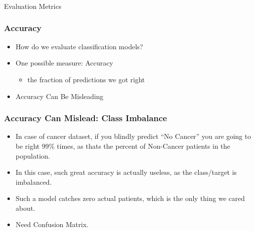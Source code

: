 \begin{frame}[fragile]\frametitle{}
\begin{center}
{\Large Evaluation Metrics}
\end{center}
\end{frame}


\begin{frame}[fragile]\frametitle{Accuracy}
\begin{itemize}
\item How do we evaluate classification models?
\item One possible measure: Accuracy
	\begin{itemize}
	\item the fraction of predictions we got right
	\end{itemize}
\item Accuracy Can Be Misleading
\end{itemize}

\end{frame}

\begin{frame}[fragile]\frametitle{Accuracy Can Mislead: Class Imbalance}
\begin{itemize}
\item In case of cancer dataset, if you blindly predict ``No Cancer'' you are going to be right 99\% times, as thats the percent of Non-Cancer patients in the population.
\item In this case, such great accuracy is actually useless, as the class/target is imbalanced.
\item Such a model catches zero actual patients, which is the only thing we cared about.
\item Need Confusion Matrix.
\end{itemize}

\end{frame}

